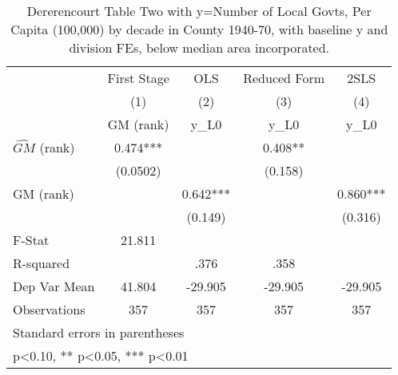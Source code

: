 \begin{table}[htbp]\centering
\def\sym#1{\ifmmode^{#1}\else\(^{#1}\)\fi}
\caption{Dererencourt Table Two with y=Number of Local Govts, Per Capita (100,000) by decade in County 1940-70, with baseline y and division FEs, below median area incorporated.}
\begin{tabular}{l*{4}{c}}
\toprule
                    & First Stage   &         OLS   &Reduced Form   &        2SLS   \\
                    &\multicolumn{1}{c}{(1)}&\multicolumn{1}{c}{(2)}&\multicolumn{1}{c}{(3)}&\multicolumn{1}{c}{(4)}\\
                    &\multicolumn{1}{c}{GM  (rank)}&\multicolumn{1}{c}{y\_L0}&\multicolumn{1}{c}{y\_L0}&\multicolumn{1}{c}{y\_L0}\\
\midrule
$\hat{GM}$ (rank)   &       0.474***&               &       0.408** &               \\
                    &    (0.0502)   &               &     (0.158)   &               \\
\addlinespace
GM  (rank)          &               &       0.642***&               &       0.860***\\
                    &               &     (0.149)   &               &     (0.316)   \\
\midrule
F-Stat              &      21.811   &               &               &               \\
R-squared           &               &        .376   &        .358   &               \\
Dep Var Mean        &      41.804   &     -29.905   &     -29.905   &     -29.905   \\
Observations        &         357   &         357   &         357   &         357   \\
\bottomrule
\multicolumn{5}{l}{\footnotesize Standard errors in parentheses}\\
\multicolumn{5}{l}{\footnotesize * p<0.10, ** p<0.05, *** p<0.01}\\
\end{tabular}
\end{table}
